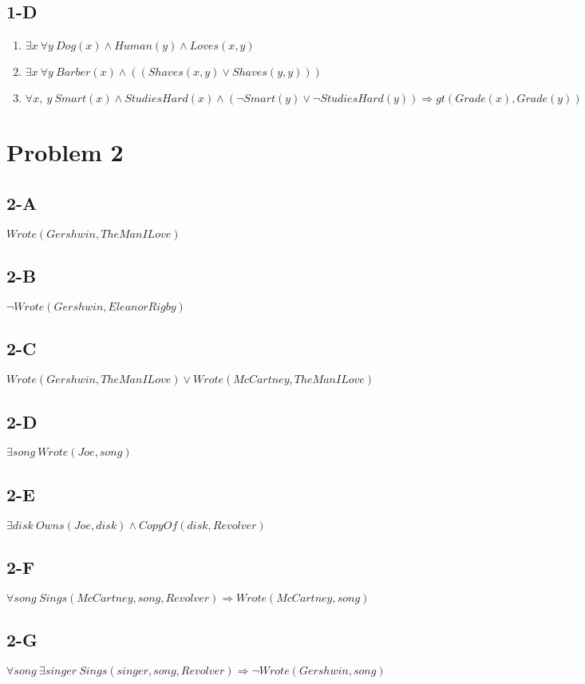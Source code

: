 \documentclass{article}
\begin{document}
        \subsection{1-D}
            \begin{enumerate}
                \item $\exists x\:\forall y\: Dog(x)\land Human(y)\land Loves(x, y)$
                \item $\exists x\: \forall y\: Barber(x)\land ((Shaves(x, y) \lor Shaves(y, y)))$
                \item $\forall x,\: y\: Smart(x)\land StudiesHard(x)\land (\lnot Smart(y)\lor \lnot StudiesHard(y)) \Rightarrow  gt(Grade(x), Grade(y))$
            \end{enumerate}

    \section{Problem 2}
        \subsection{2-A}
            $Wrote(Gershwin, The Man I Love)$
        \subsection{2-B}
            $\lnot Wrote(Gershwin, Eleanor Rigby)$
        \subsection{2-C}
            $Wrote(Gershwin, The Man I Love)\lor Wrote(McCartney, The Man I Love)$
        \subsection{2-D}
            $\exists song\: Wrote(Joe, song)$
        \subsection{2-E}
            $\exists disk\: Owns(Joe, disk)\land CopyOf(disk, Revolver)$
        \subsection{2-F}
            $\forall song\: Sings(McCartney, song, Revolver) \Rightarrow Wrote(McCartney, song)$
        \subsection{2-G}
            $\forall song\: \exists singer\: Sings(singer, song, Revolver) \Rightarrow \lnot Wrote(Gershwin, song)$
\end{document}
